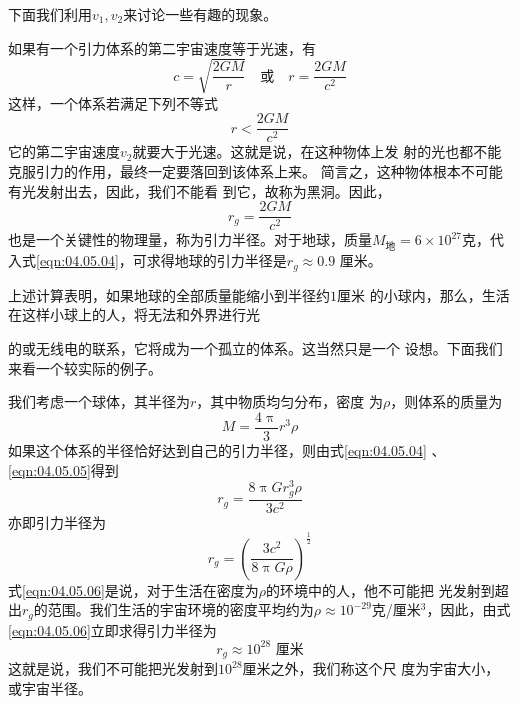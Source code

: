 下面我们利用$ v _ 1 , v _ 2 $来讨论一些有趣的现象。

如果有一个引力体系的第二宇宙速度等于光速，有
\begin{equation*}
  c = \sqrt { \frac { 2 G M } { r } } \quad
  \text{或} \quad
  r = \frac { 2 G M } { c ^ { 2 } }
\end{equation*}
这样，一个体系若满足下列不等式
\begin{equation*}
  r < \frac { 2 G M } { c ^ { 2 } }
\end{equation*}
它的第二宇宙速度$ v_2 $就要大于光速。这就是说，在这种物体上发
射的光也都不能克服引力的作用，最终一定要落回到该体系上来。
简言之，这种物体根本不可能有光发射出去，因此，我们不能看
到它，故称为黑洞。因此，
\begin{equation}\label{eqn:04.05.04}
  r _ { g } = \frac { 2 G M } { c ^ { 2 } }
\end{equation}
也是一个关键性的物理量，称为引力半径。对于地球，质量$ M _ { \text{地} }= 6 \times 1 0 ^ { 2 7 } $克，代入式\eqref{eqn:04.05.04}，可求得地球的引力半径是$ r _ { g } \approx 0 . 9 $
厘米。

上述计算表明，如果地球的全部质量能缩小到半径约$ 1 $厘米
的小球内，那么，生活在这样小球上的人，将无法和外界进行光

\clearpage\noindent
的或无线电的联系，它将成为一个孤立的体系。这当然只是一个
设想。下面我们来看一个较实际的例子。

我们考虑一个球体，其半径为$ r $，其中物质均匀分布，密度
为$ \rho $，则体系的质量为
\begin{equation}\label{eqn:04.05.05}
  M = \frac { 4 \uppi } { 3 } r ^ { 3 } \rho
\end{equation}
如果这个体系的半径恰好达到自己的引力半径，则由式\eqref{eqn:04.05.04} 、\eqref{eqn:04.05.05}得到
\begin{equation*}
  r _ { g } = \frac { 8 \uppi G r _ { g } ^ { 3 } \rho } { 3 c ^ { 2 } }
\end{equation*}
亦即引力半径为
\begin{equation}\label{eqn:04.05.06}
  r _ { g } = \left( \frac { 3 c ^ { 2 } } { 8 \uppi G \rho } \right) ^ { \frac { 1 } { 2 } }
\end{equation}
式\eqref{eqn:04.05.06}是说，对于生活在密度为$ \rho $的环境中的人，他不可能把
光发射到超出$ r_g $的范围。我们生活的宇宙环境的密度平均约为$ \rho
  \approx 10 ^ {-29}$克/厘米$ ^3 $，因此，由式\eqref{eqn:04.05.06}立即求得引力半径为
\begin{equation*}
  r _ g \approx 10 ^ {28}\text{ 厘米}
\end{equation*}
这就是说，我们不可能把光发射到$ 10 ^ {28} $厘米之外，我们称这个尺
度为宇宙大小，或宇宙半径。
